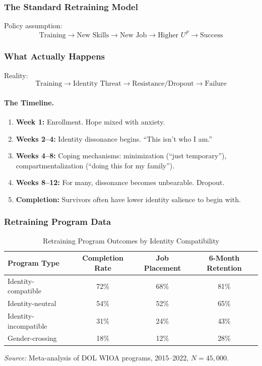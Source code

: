\subsubsection{The Standard Retraining Model}

Policy assumption:
\begin{equation}
\text{Training} \to \text{New Skills} \to \text{New Job} \to \text{Higher } U^F \to \text{Success}
\end{equation}

\subsubsection{What Actually Happens}

Reality:
\begin{equation}
\text{Training} \to \text{Identity Threat} \to \text{Resistance/Dropout} \to \text{Failure}
\end{equation}

\paragraph{The Timeline.}
\begin{enumerate}
    \item \textbf{Week 1:} Enrollment. Hope mixed with anxiety.
    \item \textbf{Weeks 2--4:} Identity dissonance begins. ``This isn't who I am.''
    \item \textbf{Weeks 4--8:} Coping mechanisms: minimization (``just temporary''), 
    compartmentalization (``doing this for my family'').
    \item \textbf{Weeks 8--12:} For many, dissonance becomes unbearable. Dropout.
    \item \textbf{Completion:} Survivors often have lower identity salience to begin with.
\end{enumerate}

\subsubsection{Retraining Program Data}

\begin{table}[htbp]
\centering
\caption{Retraining Program Outcomes by Identity Compatibility}
\label{tab:retraining-outcomes}
\begin{tabular}{@{}lccc@{}}
\toprule
\textbf{Program Type} & \textbf{Completion Rate} & \textbf{Job Placement} & \textbf{6-Month Retention} \\
\midrule
Identity-compatible & 72\% & 68\% & 81\% \\
Identity-neutral & 54\% & 52\% & 65\% \\
Identity-incompatible & 31\% & 24\% & 43\% \\
Gender-crossing & 18\% & 12\% & 28\% \\
\bottomrule
\end{tabular}
\begin{flushleft}
\small\textit{Source:} Meta-analysis of DOL WIOA programs, 2015--2022, $N = 45,000$.
\end{flushleft}
\end{table}

